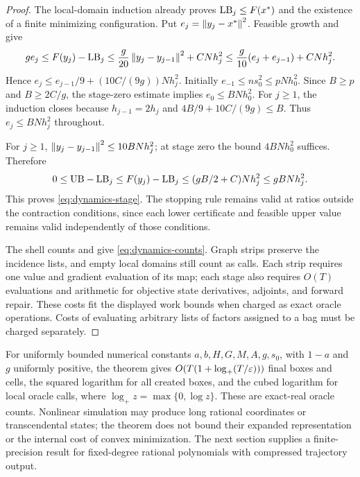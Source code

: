 \begin{proof}
The local-domain induction already proves $\mathrm{LB}_j\le F(x^*)$ and the
existence of a finite minimizing configuration. Put
$e_j=\left\lVert y_j-x^*\right\rVert^2$. Feasible growth and
 give
\[
 ge_j\le F(y_j)-\mathrm{LB}_j
 \le\frac g{20}\left\lVert y_j-y_{j-1}\right\rVert^2+CNh_j^2
 \le\frac g{10}(e_j+e_{j-1})+CNh_j^2.
\]
Hence $e_j\le e_{j-1}/9+(10C/(9g))Nh_j^2$.
Initially $e_{-1}\le n s_0^2\le pNh_0^2$.
Since $B\ge p$ and $B\ge2C/g$, the stage-zero estimate implies
$e_0\le BNh_0^2$. For $j\ge1$, the induction closes because
$h_{j-1}=2h_j$ and $4B/9+10C/(9g)\le B$. Thus
$e_j\le BNh_j^2$ throughout.

For $j\ge1$, $\left\lVert y_j-y_{j-1}\right\rVert^2\le10BNh_j^2$; at stage zero
the bound $4BNh_0^2$ suffices. Therefore
\[
 0\le\mathrm{UB}-\mathrm{LB}_j\le F(y_j)-\mathrm{LB}_j
      \le(gB/2+C)Nh_j^2\le gBNh_j^2.
\]
This proves \eqref{eq:dynamics-stage}. The stopping rule remains valid
at ratios outside the contraction conditions, since each lower certificate
and feasible upper value remains valid independently of those conditions.

The shell counts and  give
\eqref{eq:dynamics-counts}. Graph strips preserve the incidence lists,
and empty local domains still count as calls. Each strip requires one
value and gradient evaluation of its map; each stage also requires
$O(T)$ evaluations and arithmetic for objective state derivatives,
adjoints, and forward repair. These costs fit the displayed work bounds
when charged as exact oracle operations. Costs of evaluating arbitrary
lists of factors assigned to a bag must be charged separately.
\end{proof}

For uniformly bounded numerical constants
$a,b,H,G,M,A,g,s_0$, with $1-a$ and $g$ uniformly positive, the theorem
gives $O(T(1+\log_+(T/\varepsilon)))$ final boxes and cells, the squared
logarithm for all created boxes, and the cubed logarithm for local oracle
calls, where $\log_+z=\max\{0,\log z\}$. These are exact-real oracle counts.
Nonlinear simulation may produce
long rational coordinates or transcendental states; the theorem does not
bound their expanded representation or the internal cost of convex
minimization. The next section supplies a finite-precision result for
fixed-degree rational polynomials with compressed trajectory output.

